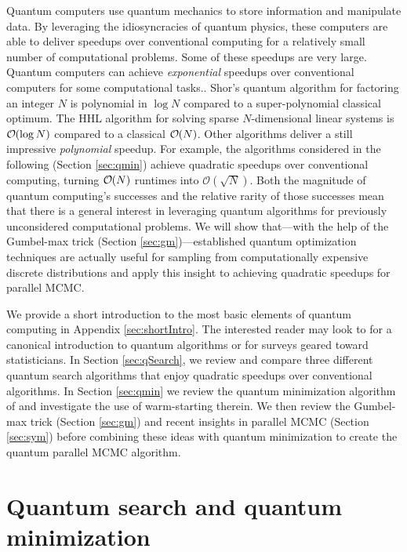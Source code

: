 \documentclass[12pt]{article} %
\newcommand{\order}[1]{{\cal O}\hspace{-0.2em}\left( #1 \right)}
\begin{document}
Quantum computers use quantum mechanics to store information and manipulate data. By leveraging the idiosyncracies of quantum physics, these computers are able to deliver speedups over conventional computing for a relatively small number of computational problems. Some of these speedups are very large. Quantum computers can achieve \emph{exponential} speedups over conventional computers for some computational tasks..  Shor's quantum algorithm for factoring an integer $N$ \citep{shor} is polynomial in $\log N$ compared to a super-polynomial classical optimum. The HHL algorithm for solving sparse $N$-dimensional linear systems \citep{harrow2009quantum} is $\order{\log N}$ compared to a classical $\order{N}$. Other algorithms deliver a still impressive \emph{polynomial} speedup.  For example, the algorithms considered in the following (Section \ref{sec:qmin}) achieve quadratic speedups over conventional computing, turning  $\order{N}$ runtimes into $\mathcal{O}(\sqrt{ N})$.  
 Both the magnitude of quantum computing's successes and the relative rarity of those successes mean that there is a general interest in leveraging quantum algorithms for previously unconsidered computational problems.  We will show that---with the help of the Gumbel-max trick (Section \ref{sec:gm})---established quantum optimization techniques are actually useful for sampling from computationally expensive discrete distributions and apply this insight to achieving quadratic speedups for parallel MCMC. 

We provide a short introduction to the most basic elements of quantum computing in Appendix \ref{sec:shortIntro}. The interested reader may look to \citet{nielsen2002quantum} for a canonical introduction to quantum algorithms or \citet{lopatnikova2021introduction,wang2022quantum} for surveys geared toward statisticians.   In Section \ref{sec:qSearch}, we review and compare three different quantum search algorithms that enjoy quadratic speedups over conventional algorithms.  In Section \ref{sec:qmin} we review the quantum minimization algorithm of \citet{durr1996quantum} and investigate the use of warm-starting therein.  We then review the Gumbel-max trick (Section \ref{sec:gm}) and recent insights in parallel MCMC (Section \ref{sec:sym}) before combining these ideas with quantum minimization to create the quantum parallel MCMC algorithm. 






\section{Quantum search and quantum minimization}\label{sec:searchAndMin}
\end{document}
